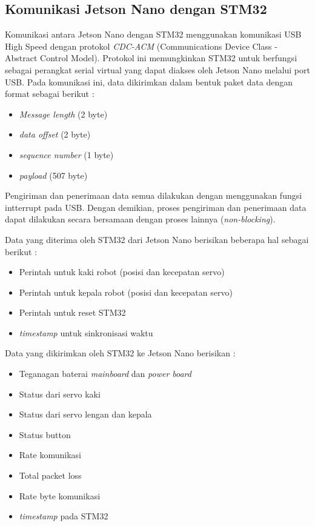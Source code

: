 \subsection{Komunikasi Jetson Nano dengan STM32}
\label{subsection: komunikasi_jetson_stm32}
Komunikasi antara Jetson Nano dengan STM32 menggunakan komunikasi USB High Speed
dengan protokol \emph{CDC-ACM} (Communications Device Class - Abstract Control
Model). Protokol ini memungkinkan STM32 untuk berfungsi sebagai perangkat serial
virtual yang dapat diakses oleh Jetson Nano melalui port USB. Pada komunikasi ini,
data dikirimkan dalam bentuk paket data dengan format sebagai berikut :
\begin{itemize}
  \item \emph{Message length} (2 byte)
  \item \emph{data offset} (2 byte)
  \item \emph{sequence number} (1 byte)
  \item \emph{payload} (507 byte)
\end{itemize}
Pengiriman dan penerimaan data semua dilakukan dengan menggunakan fungsi intterrupt
pada USB. Dengan demikian, proses pengiriman dan penerimaan data dapat dilakukan
secara bersamaan dengan proses lainnya (\emph{non-blocking}).

Data yang diterima oleh STM32 dari Jetson Nano berisikan beberapa hal sebagai berikut :
\begin{itemize}
  \item Perintah untuk kaki robot (posisi dan kecepatan servo)
  \item Perintah untuk kepala robot (posisi dan kecepatan servo)
  \item Perintah untuk reset STM32
  \item \emph{timestamp} untuk sinkronisasi waktu
\end{itemize}
Data yang dikirimkan oleh STM32 ke Jetson Nano berisikan :
\begin{itemize}
  \item Teganagan baterai \emph{mainboard} dan \emph{power board}
  \item Status dari servo kaki
  \item Status dari servo lengan dan kepala
  \item Status button
  \item Rate komunikasi 
  \item Total packet loss
  \item Rate byte komunikasi
  \item \emph{timestamp} pada STM32
\end{itemize}

